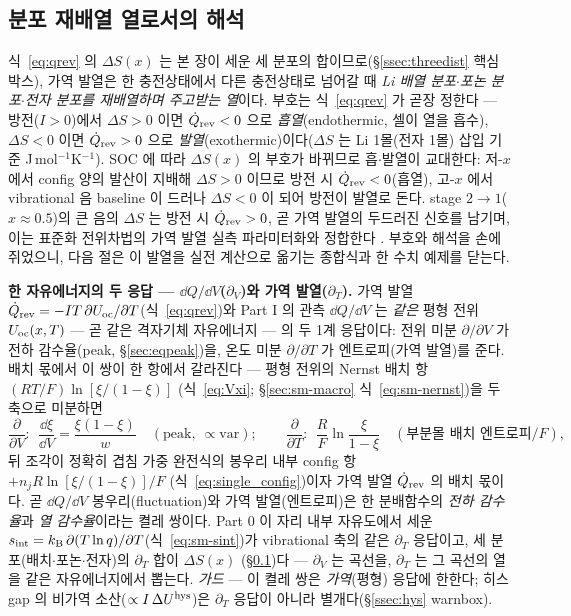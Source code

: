\subsection{분포 재배열 열로서의 해석}\label{ssec:revinterp}
식~\eqref{eq:qrev} 의 $\Delta S(x)$ 는 본 장이 세운 세 분포의 합이므로(\S\ref{ssec:threedist} 핵심 박스),
가역 발열은 한 충전상태에서 다른 충전상태로 넘어갈 때 \emph{Li 배열 분포$\cdot$포논 분포$\cdot$전자 분포를
재배열하며 주고받는 열}이다. 부호는 식~\eqref{eq:qrev} 가 곧장 정한다 --- 방전($I>0$)에서 $\Delta S>0$ 이면
$\dot Q_{\mathrm{rev}}<0$ 으로 \emph{흡열}(endothermic, 셀이 열을 흡수), $\Delta S<0$ 이면 $\dot Q_{\mathrm{rev}}>0$ 으로
\emph{발열}(exothermic)이다($\Delta S$ 는 Li 1몰(전자 1몰) 삽입 기준 J\,mol$^{-1}$K$^{-1}$). SOC 에 따라
$\Delta S(x)$ 의 부호가 바뀌므로 흡$\cdot$발열이 교대한다: 저-$x$ 에서 config 양의 발산이 지배해 $\Delta S>0$
이므로 방전 시 $\dot Q_{\mathrm{rev}}<0$(흡열), 고-$x$ 에서 vibrational 음 baseline 이 드러나 $\Delta S<0$ 이 되어 방전이
발열로 돈다. stage $2\to1$($x\approx0.5$)의 큰 음의 $\Delta S$ 는 방전 시 $\dot Q_{\mathrm{rev}}>0$, 곧 가역 발열의
두드러진 신호를 남기며, 이는 표준화 전위차법의 가역 발열 실측 파라미터화와 정합한다 \cite{standardised2024}. 부호와
해석을 손에 쥐었으니, 다음 절은 이 발열을 실전 계산으로 옮기는 종합식과 한 수치 예제를 닫는다.

\begin{bgbox}
\textbf{한 자유에너지의 두 응답 --- $\dd Q/\dd V$($\partial_V$)와 가역 발열($\partial_T$).} 가역 발열
$\dot Q_{\mathrm{rev}}=-IT\,\partial U_{\mathrm{oc}}/\partial T$(식~\eqref{eq:qrev})와 Part I 의 관측 $\dd Q/\dd V$ 는 \emph{같은}
평형 전위 $U_{\mathrm{oc}}(x,T)$ --- 곧 같은 격자기체 자유에너지 --- 의 두 1계 응답이다: 전위 미분 $\partial/\partial V$
가 전하 감수율(peak, \S\ref{sec:eqpeak})을, 온도 미분 $\partial/\partial T$ 가 엔트로피(가역 발열)를 준다. 배치
몫에서 이 쌍이 한 항에서 갈라진다 --- 평형 전위의 Nernst 배치 항 $(RT/F)\ln[\xi/(1-\xi)]$
(식~\eqref{eq:Vxi}; \S\ref{sec:sm-macro} 식~\eqref{eq:sm-nernst})을 두 축으로 미분하면
\[
\frac{\partial}{\partial V}:\ \ \frac{\dd\xi}{\dd V}=\frac{\xi(1-\xi)}{w}\quad(\text{peak},\ \propto\mathrm{var});
\qquad
\frac{\partial}{\partial T}:\ \ \frac{R}{F}\ln\frac{\xi}{1-\xi}\quad(\text{부분몰 배치 엔트로피}/F),
\]
뒤 조각이 정확히 겹침 가중 완전식의 봉우리 내부 config 항 $+n_jR\ln[\xi/(1-\xi)]/F$
(식~\eqref{eq:single_config})이자 가역 발열 $\dot Q_{\mathrm{rev}}$ 의 배치 몫이다. 곧 $\dd Q/\dd V$ 봉우리(fluctuation)와 가역
발열(엔트로피)은 한 분배함수의 \emph{전하 감수율}과 \emph{열 감수율}이라는 켤레 쌍이다. Part 0 이 자리 내부
자유도에서 세운 $s_\mathrm{int}=k_{\mathrm B}\,\partial(T\ln q)/\partial T$(식~\eqref{eq:sm-sint})가 vibrational 축의
같은 $\partial_T$ 응답이고, 세 분포(배치$\cdot$포논$\cdot$전자)의 $\partial_T$ 합이 $\Delta S(x)$
(\S\ref{ssec:revinterp})다 --- $\partial_V$ 는 곡선을, $\partial_T$ 는 그 곡선의 열을 같은 자유에너지에서
뽑는다. \emph{가드} --- 이 켤레 쌍은 \emph{가역}(평형) 응답에 한한다; 히스 gap 의 비가역
소산($\propto I\,\Delta U^{\mathrm{hys}}$)은 $\partial_T$ 응답이 아니라 별개다(\S\ref{ssec:hys} warnbox).
\end{bgbox}


